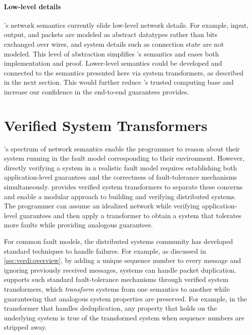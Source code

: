 \paragraph{Low-level details}

\Verdi's network semantics currently elide low-level network details.
%
For example, input, output, and packets are modeled as abstract datatypes
rather than bits exchanged over wires, and system details such as
connection state are not modeled.
%
This level of abstraction simplifies \Verdi's semantics and eases both
implementation and proof.
%
Lower-level semantics could be developed and connected to the semantics
presented here via system transformers, as described in the next section.
%
This would further reduce \Verdi's trusted computing base and increase our
confidence in the end-to-end guarantees \Verdi provides.

\section{Verified System Transformers}
\label{sec:verdi:libraries}

\Verdi's spectrum of network semantics enable the programmer to reason
about their system running in the fault model corresponding to their
environment. However, directly verifying a system in a realistic fault
model requires establishing both application-level guarantees and the
correctness of fault-tolerance mechanisms simultaneously.  \Verdi
provides verified system transformers to separate these concerns and
enable a modular approach to building and verifying distributed
systems. The programmer can assume an idealized network while
verifying application-level guarantees and then apply a transformer to
obtain a system that tolerates more faults while providing analogous guarantees.

For common fault models, the distributed systems community has
developed standard techniques to handle failures. For example, as
discussed in \cref{sec:verdi:overview}, by adding a unique sequence
number to every message and ignoring previously received messages,
systems can handle packet duplication. \Verdi supports such
standard fault-tolerance mechanisms through verified system transformers,
which \emph{transform} systems from one semantics to another while
guaranteeing that analogous system properties are preserved. For
example, in the transformer that handles deduplication, any property
that holds on the underlying system is true of the transformed
system when sequence numbers are stripped away.


